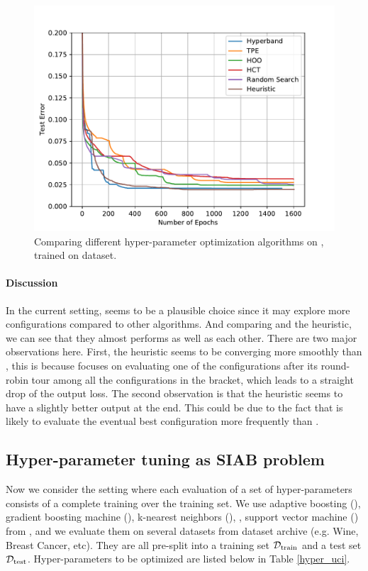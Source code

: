 \documentclass[twoside,11pt]{article}
\begin{document}
\begin{figure}[ht]
    \centering
    \includegraphics[scale=0.8]{img/mnist/mlp_0_bis.pdf}
    \caption{Comparing different hyper-parameter optimization algorithms on \MLP, trained on \MNIST dataset.}
    \label{fig:mlp}
\end{figure}

\paragraph{\textbf{Discussion}} In the current setting, \Hyperband seems to be a plausible choice since it may explore more configurations compared to other algorithms. And comparing \Hyperband and the heuristic, we can see that they almost performs as well as each other. There are two major observations here. First, the heuristic seems to be converging more smoothly than \Hyperband, this is because \Hyperband focuses on evaluating one of the configurations after its round-robin tour among all the configurations in the bracket, which leads to a straight drop of the output loss. The second observation is that the heuristic seems to have a slightly better output at the end. This could be due to the fact that \TTTS is likely to evaluate the eventual best configuration more frequently than \SHA.


\subsection{Hyper-parameter tuning as SIAB problem}

Now we consider the setting where each evaluation of a set of hyper-parameters consists of a complete training over the training set. We use adaptive boosting (\Ada), gradient boosting machine (\GBM), k-nearest neighbors (\KNN), \MLP, support vector machine (\SVM) from \Scikit, and we evaluate them on several datasets from \UCI dataset archive (e.g. Wine, Breast Cancer, etc). They are all pre-split into a training set $\mathcal{D}_{\operatorname{train}}$ and a test set $\mathcal{D}_{\operatorname{test}}$. Hyper-parameters to be optimized are listed below in Table \ref{hyper_uci}.
\end{document}
